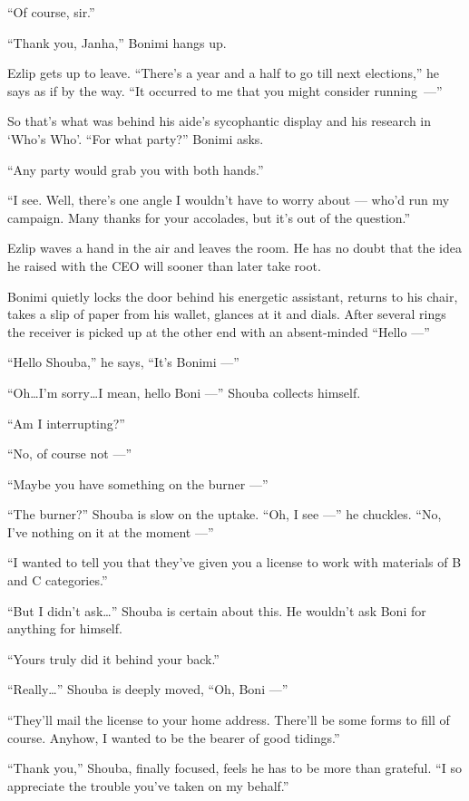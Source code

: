 \documentclass[twoside,11pt,openany]{book}
\begin{document}
``Of course, sir.''

``Thank you, Janha,'' Bonimi hangs up.

Ezlip gets up to leave. ``There's a year and a half to go till next elections,'' he says as if
by the way. ``It occurred to me that you might consider \hbox{running ---''}

So that's what was behind his aide's sycophantic display{ }and his research in  `Who's Who'.
``For what party?'' Bonimi asks.

``Any party would grab you with both hands.''

``I see. Well, there's one angle I wouldn't have to worry about --- who'd run my campaign. Many thanks for
your accolades, but it's out of the question.''

Ezlip waves a hand in the air and leaves the room. He has no doubt that the idea he raised with the CEO will sooner than
later take root{. }

Bonimi quietly locks the door behind his energetic assistant, returns to his chair, takes a slip of paper from his
wallet, glances at it and dials.  After several rings the receiver is picked up at the other end with an absent-minded
``Hello ---''

``Hello Shouba,'' he says, ``It's Bonimi ---''

``Oh{\ldots}I'm sorry{\ldots}I mean, hello Boni ---'' Shouba collects himself.

``Am I interrupting?''

``No, of course not ---''

``Maybe you have something on the burner ---''

``The burner?'' Shouba is slow on the uptake.  ``Oh, I see ---'' he
chuckles. ``No, I've nothing on it at the moment ---''

``I wanted to tell you that they've given you a license to work with materials of B and C
categories.''

``But I didn't ask{\ldots}'' Shouba is certain about this. He wouldn't ask Boni for anything
for himself.

``Yours truly did it behind your back.''

``Really{\ldots}'' Shouba is deeply moved, ``Oh, Boni ---''

``They'll mail the license to your home address. There'll be some forms to fill of course. Anyhow, I wanted
to be the bearer of good tidings.''

``Thank you,'' Shouba, finally focused, feels he has to be more than grateful.
``I so appreciate the trouble you've taken on my behalf.''
\end{document}
